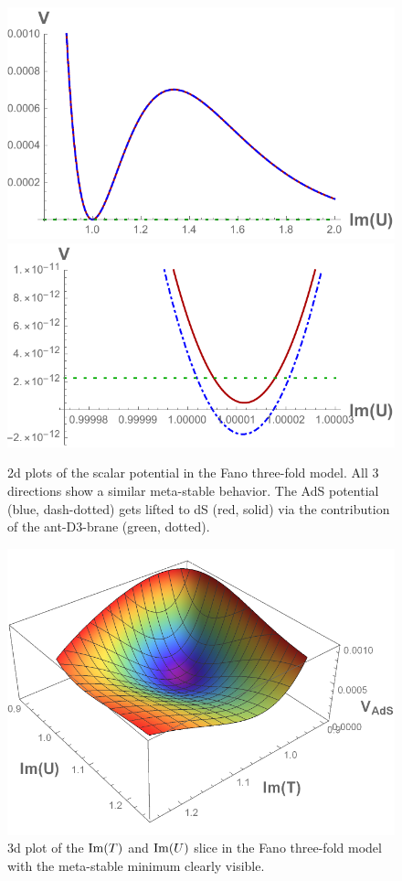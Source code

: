 \documentclass[12pt]{report}
\def\rmim{{\rm Im}}
\begin{document}
\begin{figure}[htb]
\includegraphics[scale=0.56]{quevedo_38_U_large.pdf}\qquad\includegraphics[scale=0.6]{quevedo_38_U_close.pdf}
\caption{2d plots of the scalar potential in the Fano three-fold model. All 3 directions show a similar meta-stable behavior. The AdS potential (blue, dash-dotted) gets lifted to dS (red, solid) via the contribution of the ant-D3-brane (green, dotted).}
\label{fig:swiss2d}
\end{figure}

\begin{figure}[htb]
\centering
\includegraphics[scale=0.8]{quevedo_38_3D_large.pdf}
\caption{3d plot of the $\rmim(T)$ and $\rmim(U)$ slice in the Fano three-fold model with the meta-stable minimum clearly visible.}
\label{fig:swiss3d}
\end{figure}
\end{document}
